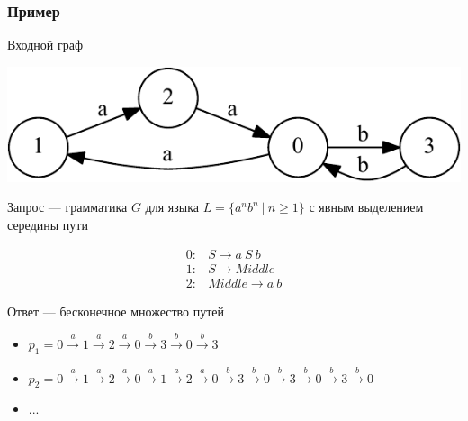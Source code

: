 \documentclass[xcolor=table,aspectratio=169]{beamer}
\begin{document}
\begin{frame}[fragile]
  \transwipe[direction=90]
  \frametitle{Пример}
Входной граф 
\vspace{-0.5cm}
\begin{center}
        \includegraphics[height=0.2\textheight]{pictures/input.pdf} 
\end{center}
Запрос --- грамматика $G$ для языка $L=\{a^n b^n \ | \ n \geq 1\}$ с явным выделением середины пути \\
\begin{center}
   \[
\begin{array}{rl} 
   0:& S \rightarrow a \ S \ b \\
   1:& S \rightarrow Middle \\
   2:& Middle \rightarrow a \ b
\end{array}
\]
\end{center}
\vspace{0.8em}
Ответ --- бесконечное множество путей
\begin{itemize}
\item $p_1 = 0\xrightarrow{a}1\xrightarrow{a}2\xrightarrow{a}0\xrightarrow{b}3\xrightarrow{b}0\xrightarrow{b}3$
\item $p_2 = 0\xrightarrow{a}1\xrightarrow{a}2\xrightarrow{a}0\xrightarrow{a}1\xrightarrow{a}2\xrightarrow{a}0\xrightarrow{b}3\xrightarrow{b}0\xrightarrow{b}3\xrightarrow{b}0\xrightarrow{b}3\xrightarrow{b}0$
\item ...
\end{itemize}

\end{frame}
\end{document}
